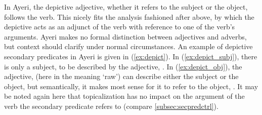 In Ayeri, the depictive adjective, whether it refers to the subject or the
object, follows the verb. This nicely fits the analysis fashioned after
\citet{mueller2002} above, by which the depictive acts as an adjunct of the
verb with reference to one of the verb's arguments. Ayeri makes no formal
distinction between adjectives and adverbs, but context should clarify under
normal circumstances. An example of depictive secondary predicates in Ayeri is
given in (\ref{ex:depict}). In (\ref{ex:depict_subj}), there is only a subject,
 to be described by the adjective, . In
(\ref{ex:depict_obj}), the adjective,  (here in the
meaning `raw') can describe either the subject or the object, but semantically,
it makes most sense for it to refer to the object, . It
may be noted again here that topicalization has no impact on the argument of
the verb the secondary predicate refers to (compare 
\autoref{subsec:secpredctrl}).

